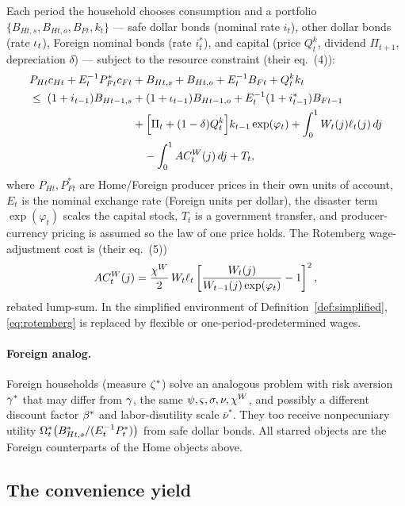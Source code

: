 Each period the household chooses consumption and a portfolio
$\{B_{Ht,s},B_{Ht,o},B_{Ft},k_t\}$ --- safe dollar bonds (nominal rate $i_t$),
other dollar bonds (rate $\iota_t$), Foreign nominal bonds (rate $i_t^{*}$), and
capital (price $Q^k_t$, dividend $\Pi_{t+1}$, depreciation $\delta$) --- subject
to the resource constraint (their eq.~(4)):
\begin{align}
\label{eq:budget}
P_{Ht}c_{Ht}+E_t^{-1}P^{*}_{Ft}c_{Ft}
&+B_{Ht,s}+B_{Ht,o}+E_t^{-1}B_{Ft}+Q^k_t k_t \notag\\
\le\;(1+i_{t-1})B_{Ht-1,s}&+(1+\iota_{t-1})B_{Ht-1,o}+E_t^{-1}(1+i^{*}_{t-1})B_{Ft-1}\notag\\
&+\Bigl[\Pi_t+(1-\delta)Q^k_t\Bigr]k_{t-1}\exp(\varphi_t)
+\int_0^1 W_t(j)\ell_t(j)\,dj\notag\\
&\quad-\int_0^1 AC^W_t(j)\,dj+T_t,
\end{align}
where $P_{Ht},P^{*}_{Ft}$ are Home/Foreign producer prices in their own units of
account, $E_t$ is the nominal exchange rate (Foreign units per dollar), the
disaster term $\exp(\varphi_t)$ scales the capital stock, $T_t$ is a government
transfer, and producer-currency pricing is assumed so the law of one price
holds. The Rotemberg wage-adjustment cost is (their eq.~(5))
\begin{equation}
\label{eq:rotemberg}
AC^W_t(j)=\frac{\chi^{W}}{2}\,W_t\ell_t
\left[\frac{W_t(j)}{W_{t-1}(j)\exp(\varphi_t)}-1\right]^2,
\end{equation}
rebated lump-sum. In the simplified environment of
Definition~\ref{def:simplified}, \eqref{eq:rotemberg} is replaced by flexible or
one-period-predetermined wages.

\paragraph{Foreign analog.} Foreign households (measure $\zeta^{*}$) solve an
analogous problem with risk aversion $\gamma^{*}$ that may differ from $\gamma$, the
same $\psi,\varsigma,\sigma,\nu,\chi^{W}$, and possibly a different discount factor
$\beta^{*}$ and labor-disutility scale $\bar\nu^{*}$. They too receive nonpecuniary
utility $\Omega^{*}_t\bigl(B^{*}_{Ht,s}/(E_t^{-1}P^{*}_t)\bigr)$ from safe dollar
bonds. All starred objects are the Foreign counterparts of the Home objects
above.

\subsection{The convenience yield}
\label{sec:cy}

